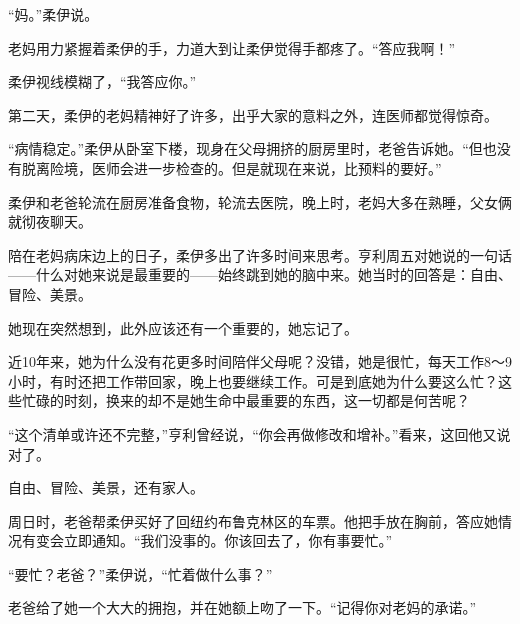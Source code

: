 “妈。”柔伊说。

老妈用力紧握着柔伊的手，力道大到让柔伊觉得手都疼了。“答应我啊！”

柔伊视线模糊了，“我答应你。”

第二天，柔伊的老妈精神好了许多，出乎大家的意料之外，连医师都觉得惊奇。

“病情稳定。”柔伊从卧室下楼，现身在父母拥挤的厨房里时，老爸告诉她。“但也没有脱离险境，医师会进一步检查的。但是就现在来说，比预料的要好。”

柔伊和老爸轮流在厨房准备食物，轮流去医院，晚上时，老妈大多在熟睡，父女俩就彻夜聊天。

陪在老妈病床边上的日子，柔伊多出了许多时间来思考。亨利周五对她说的一句话——什么对她来说是最重要的——始终跳到她的脑中来。她当时的回答是：自由、冒险、美景。

她现在突然想到，此外应该还有一个重要的，她忘记了。

近10年来，她为什么没有花更多时间陪伴父母呢？没错，她是很忙，每天工作8〜9小时，有时还把工作带回家，晚上也要继续工作。可是到底她为什么要这么忙？这些忙碌的时刻，换来的却不是她生命中最重要的东西，这一切都是何苦呢？

“这个清单或许还不完整，”亨利曾经说，“你会再做修改和增补。”看来，这回他又说对了。

自由、冒险、美景，还有家人。

周日时，老爸帮柔伊买好了回纽约布鲁克林区的车票。他把手放在胸前，答应她情况有变会立即通知。“我们没事的。你该回去了，你有事要忙。”

“要忙？老爸？”柔伊说，“忙着做什么事？”

老爸给了她一个大大的拥抱，并在她额上吻了一下。“记得你对老妈的承诺。”
